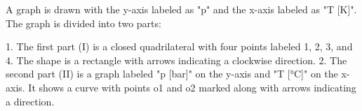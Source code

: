 A graph is drawn with the y-axis labeled as "p" and the x-axis labeled as "T [K]". The graph is divided into two parts:

1. The first part (I) is a closed quadrilateral with four points labeled 1, 2, 3, and 4. The shape is a rectangle with arrows indicating a clockwise direction.
2. The second part (II) is a graph labeled "p [bar]" on the y-axis and "T [°C]" on the x-axis. It shows a curve with points o1 and o2 marked along with arrows indicating a direction.